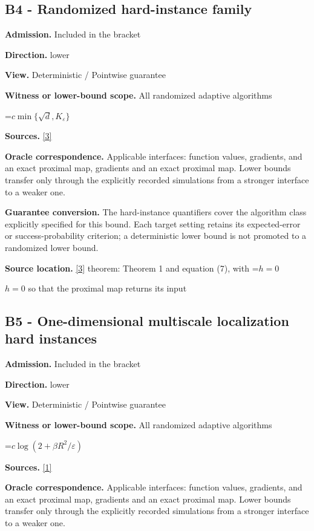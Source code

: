 \documentclass[10pt,a4paper]{article}
\newcommand{\AtlasMath}[1]{\par\begingroup\centering\setbox0=\hbox{$\displaystyle #1$}\ifdim\wd0>1.4\linewidth\typeout{ATLAS WIDE FORMULA: \the\wd0}\fi\ifdim\wd0>\linewidth\resizebox{\linewidth}{!}{\box0}\else\box0\fi\par\endgroup}
\newcommand{\AtlasInlineMath}[1]{\begingroup\setbox0=\hbox{$#1$}\ifdim\wd0>.4\linewidth\endgroup\AtlasMath{#1}\else\endgroup$#1$\fi}
\begin{document}
\subsection{B4 - Randomized hard-instance family}
\textbf{Admission.} Included in the bracket

\textbf{Direction.} lower

\textbf{View.} Deterministic / Pointwise guarantee

\textbf{Witness or lower-bound scope.} All randomized adaptive algorithms

\AtlasMath{c\min\{\sqrt d,K_\varepsilon\}}
\textbf{Sources.} \href{https://arxiv.org/pdf/2609.10874}{[3]}

\textbf{Oracle correspondence.} Applicable interfaces: function values, gradients, and an exact proximal map, gradients and an exact proximal map. Lower bounds transfer only through the explicitly recorded simulations from a stronger interface to a weaker one.

\textbf{Guarantee conversion.} The hard-instance quantifiers cover the algorithm class explicitly specified for this bound. Each target setting retains its expected-error or success-probability criterion; a deterministic lower bound is not promoted to a randomized lower bound.

\textbf{Source location.} \href{https://arxiv.org/pdf/2609.10874}{[3]} theorem: Theorem 1 and equation (7), with \AtlasInlineMath{h=0} so that the proximal map returns its input

\subsection{B5 - One-dimensional multiscale localization hard instances}
\textbf{Admission.} Included in the bracket

\textbf{Direction.} lower

\textbf{View.} Deterministic / Pointwise guarantee

\textbf{Witness or lower-bound scope.} All randomized adaptive algorithms

\AtlasMath{c\log(2+\beta R^2/\varepsilon)}
\textbf{Sources.} \href{https://www.tau.ac.il/~becka/FISTA.pdf}{[1]}

\textbf{Oracle correspondence.} Applicable interfaces: function values, gradients, and an exact proximal map, gradients and an exact proximal map. Lower bounds transfer only through the explicitly recorded simulations from a stronger interface to a weaker one.
\end{document}
